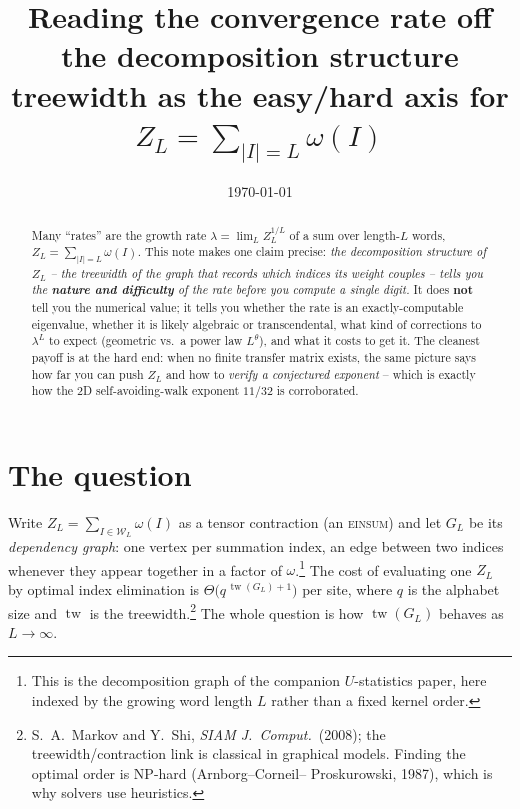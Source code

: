 \documentclass[11pt]{article}
\title{\bf Reading the convergence rate off the decomposition structure\\[2pt]
       \large treewidth as the easy/hard axis for $Z_L=\sum_{|I|=L}\omega(I)$}
\date{\today}
\newcommand{\tw}{\operatorname{tw}}
\theoremstyle{plain}
\theoremstyle{definition}
\begin{document}
\maketitle
\vspace{-1.4em}

\begin{abstract}\noindent
Many ``rates'' are the growth rate $\lambda=\lim_L Z_L^{1/L}$ of a sum over
length-$L$ words, $Z_L=\sum_{|I|=L}\omega(I)$. This note makes one claim
precise: \emph{the decomposition structure of $Z_L$ -- the treewidth of the
graph that records which indices its weight couples -- tells you the
\textbf{nature and difficulty} of the rate before you compute a single digit.}
It does \textbf{not} tell you the numerical value; it tells you whether the rate
is an exactly-computable eigenvalue, whether it is likely algebraic or
transcendental, what kind of corrections to $\lambda^L$ to expect (geometric vs.\
a power law $L^\theta$), and what it costs to get it. The cleanest payoff is at
the hard end: when no finite transfer matrix exists, the same picture says how
far you can push $Z_L$ and how to \emph{verify a conjectured exponent} -- which is
exactly how the 2D self-avoiding-walk exponent $11/32$ is corroborated.
\end{abstract}

\section{The question}

Write $Z_L=\sum_{I\in\mathcal W_L}\omega(I)$ as a tensor contraction (an
\textsc{einsum}) and let $G_L$ be its \emph{dependency graph}: one vertex per
summation index, an edge between two indices whenever they appear together in a
factor of $\omega$.\footnote{This is the decomposition graph of the companion
$U$-statistics paper, here indexed by the growing word length $L$ rather than a
fixed kernel order.} The cost of evaluating one $Z_L$ by optimal index
elimination is $\Theta\!\bigl(q^{\,\tw(G_L)+1}\bigr)$ per site, where $q$ is the
alphabet size and $\tw$ is the treewidth.\footnote{S.~A.~Markov and Y.~Shi,
\emph{SIAM J.\ Comput.}\ (2008); the treewidth/contraction link is classical in
graphical models. Finding the optimal order is NP-hard (Arnborg--Corneil--%
Proskurowski, 1987), which is why solvers use heuristics.} The whole question is
how $\tw(G_L)$ behaves as $L\to\infty$.
\end{document}
